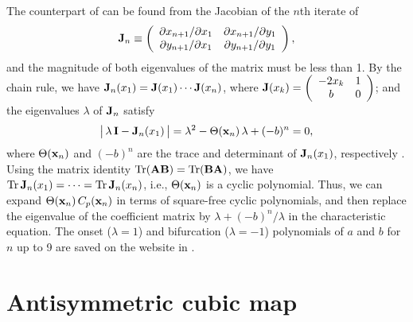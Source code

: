 \documentclass{ws-ijbc}
\begin{document}
The counterpart of 
  can be found from the Jacobian of the $n$th iterate of 
\[
  \mathbf{J}_n
  \equiv
  \left(
    \begin{array}{ccc}
      \partial x_{n+1}/\partial x_1 & \partial x_{n+1}/\partial y_1 \\
      \partial y_{n+1}/\partial x_1 & \partial y_{n+1}/\partial y_1 \\
    \end{array}
  \right),
\]
and the magnitude of both eigenvalues of the matrix must be less than 1.
By the chain rule, we have
  $\mathbf{J}_n (x_1) = \mathbf{J}(x_1) \cdots \mathbf{J}(x_n)$,
  where
$\mathbf{J}(x_k)
  =
  \left(
    \begin{array}{cc}
      -2 x_k & 1 \\
      b & 0
    \end{array}
  \right)$;
and the eigenvalues $\lambda$ of $\mathbf{J}_n$ satisfy
%
\begin{equation}
\big|\, \lambda \, \mathbf{I} - \mathbf{J}_n(x_1) \,\big|
= \lambda^2 - \Theta(\mathbf{x}_{n}) \,\lambda +(-b)^n = 0,
\notag
\end{equation}
%
where $\Theta(\mathbf{x}_{n})$ and $(-b)^n$
  are the trace and determinant of $\mathbf{J}_n(x_1)$,
  respectively \cite{huang, hitzl}.
%
%
Using the matrix identity $\mathrm{Tr}( \mathbf{A} \mathbf{B}) = \mathrm{Tr}(\mathbf{B} \mathbf{A})$,
  we have
    $\mathrm{Tr} \, \mathbf{J}_n(x_1) = \cdots = \mathrm{Tr} \, \mathbf{J}_n(x_n)$,
  i.e., $\Theta(\mathbf{x}_{n})$ is a cyclic polynomial. %
%
  Thus, we can expand $\Theta(\mathbf{x}_{n}) \, C_p(\mathbf{x}_{n})$
  in terms of square-free cyclic polynomials,
  and then replace the eigenvalue of the coefficient matrix
  by $\lambda + (-b)^n/\lambda$
  in the characteristic equation.
%
%
%
The onset ($\lambda = 1$) and bifurcation ($\lambda = -1$)
  polynomials of $a$ and $b$
  for $n$ up to 9 are saved on the website in .











\section{\label{sec:cubic}Antisymmetric cubic map}
\end{document}
